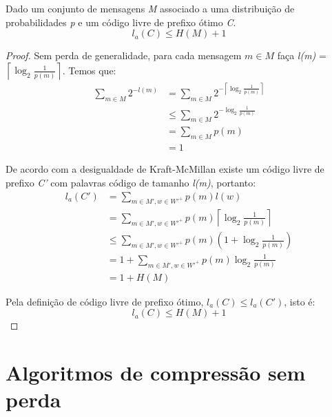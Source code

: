 \begin{lemma} Dado um conjunto de mensagens \emph{M} associado a uma distribuição de probabilidades \emph{p} e um código livre de prefixo ótimo \emph{C}.
\begin{equation*}
l_a(C) \leq H(M) + 1
\end{equation*}

\begin{proof}
Sem perda de generalidade, para cada mensagem $m \in M$ faça \emph{l(m)} = $\left \lceil{\log_2 \frac{1}{p(m)} }\right \rceil $. Temos que:
\begin{align*}
\sum_{m \in M}^{} 2^{-l(m)} &= \sum_{m \in M}^{} 2^{-\left \lceil{\log_2 \frac{1}{p(m)} }\right \rceil} \\
&\leq \sum_{m \in M}^{} 2^{-{\log_2 \frac{1}{p(m)} }} \\
&= \sum_{m \in M}^{} p(m) \\
&= 1
\end{align*}

De acordo com a desigualdade de Kraft-McMillan existe um código livre de prefixo \emph{C'}  com palavras código de tamanho \emph{l(m)}, portanto:
\begin{align*}
l_a(C') &=  \sum_{m \in M', w \in W'^+}^{}p(m) l(w) \\
&=  \sum_{m \in M', w \in W'^+}^{}p(m) \left \lceil{\log_2 \frac{1}{p(m)} }\right \rceil \\
&\leq \sum_{m \in M', w \in W'^+}^{}p(m) (1 + \log_2 \frac{1}{p(m)}) \\
&= 1 +  \sum_{m \in M', w \in W'^+}^{}p(m) \log_2 \frac{1}{p(m)} \\
&= 1 + H(M)
\end{align*}

Pela definição de código livre de prefixo ótimo, $l_a(C) \leq l_a(C')$, isto é:
\begin{equation*}
l_a(C) \leq H(M) + 1 
\end{equation*}
\end{proof}
\end{lemma}



\chapter{Algoritmos de compressão sem perda}

